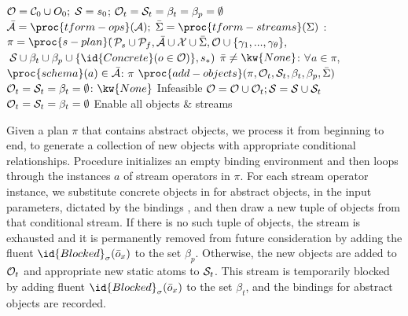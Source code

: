 \documentclass[letterpaper]{article} %
\theoremstyle{plain}\newtheorem{thm}{Theorem}
\theoremstyle{definition}\newtheorem{defn}{Definition}
\theoremstyle{plain}\newtheorem{lem}{Lemma}
\theoremstyle{plain}\newtheorem{cor}{Corollary}
\begin{document}
\begin{footnotesize}
\begin{codebox}
\zi ${\cal O} =  {\cal C}_0 \cup O_0;\; {\cal S} = s_0$;\; ${\cal O}_t = {\cal S}_t = \beta_t = \beta_p = \emptyset$ 
\zi $\bar{\cal A} = \proc{tform-ops}({\cal A});\; \bar{\Sigma} = \proc{tform-streams}(\Sigma)$ %
\zi \While {}: \Do
\zi $\pi = \proc{s-plan}($\=${\cal P}_s \cup {\cal P}_f, \bar{\cal A} \cup {\cal X} \cup \bar{\Sigma}, {\cal O} \cup \{\gamma_1, ..., \gamma_\theta\},$
\zi \> $\;{\cal S} \cup \beta_t \cup \beta_p \cup \{\id{Concrete}(o \in {\cal O})\} ,s_*)$ 
\zi \If $\pi $\=$\;\not= \kw{None}$: \Then 
\zi \If $\forall a \in \pi$, $\proc{schema}(a) \in \bar{\cal A}$: \Then 
\zi \Return $\pi$
\End
\zi $\proc{add-objects}(\pi, {\cal O}_t, {\cal S}_t,  \beta_t, \beta_p, \bar{\Sigma})$ %
\zi \Else
\zi \If ${\cal O}_t = {\cal S}_t = \beta_t = \emptyset$: \Then
\zi \Return $\kw{None}$ \Comment Infeasible
\End
\zi ${\cal O} = {\cal O} \cup {\cal O}_t; {\cal S} = {\cal S} \cup {\cal S}_t$
\zi ${\cal O}_t = {\cal S}_t = \beta_t = \emptyset$ \Comment Enable all objects \& streams
\End\End\End
\end{codebox}
\end{footnotesize}

Given a plan $\pi$ that contains abstract objects, we process it
from beginning to end, to generate a collection of new objects with
appropriate conditional relationships.  Procedure 
initializes an empty binding environment and then loops through the
instances $a$ of stream operators in $\pi$.  For each stream operator
instance, we substitute concrete objects in for abstract objects, in
the input parameters, dictated by the bindings , and then draw
a new tuple of objects from that conditional stream.  If there is no such
tuple of objects, the stream is exhausted and it is permanently removed from
future consideration by adding the fluent
$\id{Blocked}_\sigma(\bar{o}_x)$ to the set $\beta_p$. Otherwise, the new
objects are added to ${\cal O}_t$ and appropriate new static atoms to
${\cal S}_t$.  This stream is temporarily blocked by adding fluent
$\id{Blocked}_\sigma(\bar{o}_x)$ to the set $\beta_t$, and the
bindings for abstract objects are recorded.
\end{document}

